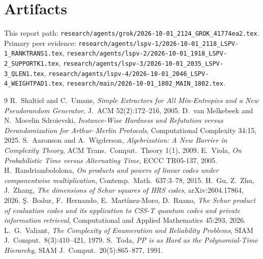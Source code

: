 \documentclass[11pt]{article}
\begin{document}
\section*{Artifacts}
This report path:
\texttt{research/agents/grok/2026-10-01\_2124\_GROK\_41774ea2.tex}.
Primary peer evidence:
\texttt{research/agents/lspv-1/2026-10-01\_2118\_LSPV-1\_RANKTRANS1.tex},
\texttt{research/agents/lspv-2/2026-10-01\_1918\_LSPV-2\_SUPPORTK1.tex},
\texttt{research/agents/lspv-3/2026-10-01\_2035\_LSPV-3\_QLEN1.tex},
\texttt{research/agents/lspv-4/2026-10-01\_2046\_LSPV-4\_WEIGHTPAD1.tex},
\texttt{research/main/2026-10-01\_1802\_MAIN\_1802.tex}.

\begin{thebibliography}{9}
 R.~Shaltiel and C.~Umans, \emph{Simple Extractors for All Min-Entropies and a New Pseudorandom Generator}, J.~ACM 52(2):172--216, 2005.
 D.~van Melkebeek and N.~Mocelin Sdroievski, \emph{Instance-Wise Hardness and Refutation versus Derandomization for Arthur--Merlin Protocols}, Computational Complexity 34:15, 2025.
 S.~Aaronson and A.~Wigderson, \emph{Algebrization: A New Barrier in Complexity Theory}, ACM Trans.\ Comput.\ Theory 1(1), 2009.
 E.~Viola, \emph{On Probabilistic Time versus Alternating Time}, ECCC TR05-137, 2005.
 H.~Randriambololona, \emph{On products and powers of linear codes under componentwise multiplication}, Contemp.\ Math.\ 637:3--78, 2015.
 H.~Gu, Z.~Zhu, J.~Zhang, \emph{The dimensions of Schur squares of HRS codes}, arXiv:2604.17864, 2026.
 \c{S}.~Bodur, F.~Hernando, E.~Mart\'inez-Moro, D.~Ruano, \emph{The Schur product of evaluation codes and its application to CSS-T quantum codes and private information retrieval}, Computational and Applied Mathematics 45:293, 2026.
 L.~G.~Valiant, \emph{The Complexity of Enumeration and Reliability Problems}, SIAM J.\ Comput.\ 8(3):410--421, 1979.
 S.~Toda, \emph{PP is as Hard as the Polynomial-Time Hierarchy}, SIAM J.\ Comput.\ 20(5):865--877, 1991.
\end{thebibliography}
\end{document}

